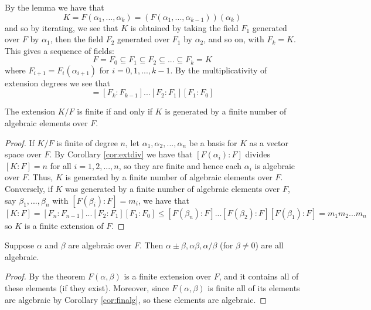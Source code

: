 By the lemma we have that \begin{equation*}
    K = F(\alpha_1,...,\alpha_k) = (F(\alpha_1,...,\alpha_{k-1}))(\alpha_k)
\end{equation*}
and so by iterating, we see that $K$ is obtained by taking the field $F_1$ generated over $F$ by $\alpha_1$, then the field $F_2$ generated over $F_1$ by $\alpha_2$, and so on, with $F_k = K$. This gives a sequence of fields: \begin{equation*}
    F = F_0 \subseteq F_1 \subseteq F_2 \subseteq ...\subseteq F_k = K
\end{equation*}
where $F_{i+1} = F_i(\alpha_{i+1})$ for $i = 0,1,...,k-1$. By the multiplicativity of extension degrees we see that \begin{equation*}
    [K:F] = [F_k:F_{k-1}]...[F_2:F_1][F_1:F_0]
\end{equation*}


\begin{theorem}\label{thm:finalgext}
    The extension $K/F$ is finite if and only if $K$ is generated by a finite number of algebraic elements over $F$.
\end{theorem}
\begin{proof}
    If $K/F$ is finite of degree $n$, let $\alpha_1,\alpha_2,...,\alpha_n$ be a basis for $K$ as a vector space over $F$. By Corollary \ref{cor:extdiv} we have that $[F(\alpha_i):F]$ divides $[K:F] = n$ for all $i = 1,2,...,n$, so they are finite and hence each $\alpha_i$ is algebraic over $F$. Thus, $K$ is generated by a finite number of algebraic elements over $F$. Conversely, if $K$ was generated by a finite number of algebraic elements over $F$, say $\beta_1,...,\beta_n$ with $[F(\beta_i):F] = m_i$, we have that $$[K:F] = [F_n:F_{n-1}]...[F_2:F_1][F_1:F_0] \leq [F(\beta_n):F]...[F(\beta_2):F][F(\beta_1):F] = m_1m_2...m_n$$ so $K$ is a finite extension of $F$.
\end{proof}


\begin{corollary}
    Suppose $\alpha$ and $\beta$ are algebraic over $F$. Then $\alpha\pm\beta,\alpha\beta,\alpha/\beta$ (for $\beta\neq 0$) are all algebraic.
\end{corollary}
\begin{proof}
    By the theorem $F(\alpha,\beta)$ is a finite extension over $F$, and it contains all of these elements (if they exist). Moreover, since $F(\alpha,\beta)$ is finite all of its elements are algebraic by Corollary \ref{cor:finalg}, so these elements are algebraic.
\end{proof}


